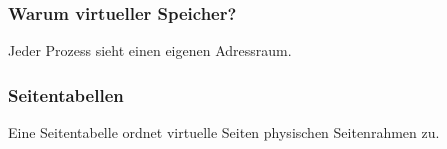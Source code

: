 
\begin{frame}
  \frametitle{Warum virtueller Speicher?}
  Jeder Prozess sieht einen eigenen Adressraum.
\end{frame}

\begin{frame}
  \frametitle{Seitentabellen}
  Eine Seitentabelle ordnet virtuelle Seiten physischen Seitenrahmen zu.
\end{frame}
